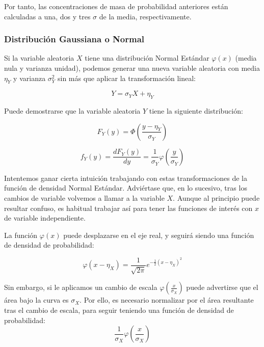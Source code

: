 \documentclass[11pt]{article}
\begin{document}
Por tanto, las concentraciones de masa de probabilidad anteriores están
calculadas a una, dos y tres \(\sigma\) de la media, respectivamente.

    \hypertarget{distribuciuxf3n-gaussiana-o-normal}{%
\subsubsection*{Distribución Gaussiana o
Normal}\label{distribuciuxf3n-gaussiana-o-normal}}

Si la variable aleatoria \(X\) tiene una distribución Normal Estándar
\(\varphi(x)\) (media nula y varianza unidad), podemos generar una nueva
variable aleatoria con media \(\eta_Y\) y varianza \(\sigma_Y^2\) sin
más que aplicar la transformación lineal:

\[Y = \sigma_Y X + \eta_Y\]

Puede demostrarse que la variable aleatoria \(Y\) tiene la siguiente
distribución:

\[F_Y(y)= \Phi(\frac{y-\eta_Y}{\sigma_Y})\]

\[f_Y(y) =\frac{dF_Y(y)}{dy} = \frac{1}{\sigma_Y}\varphi(\frac{y}{\sigma_Y})\]

    Intentemos ganar cierta intuición trabajando con estas transformaciones
de la función de densidad Normal Estándar. Adviértase que, en lo
sucesivo, tras los cambios de variable volvemos a llamar a la variable
\(X\). Aunque al principio puede resultar confuso, es habitual trabajar
así para tener las funciones de interés con \(x\) de variable
independiente.

La función \(\varphi(x)\) puede desplazarse en el eje real, y seguirá
siendo una función de densidad de probabilidad:

\[\varphi(x-\eta_X)=\frac{1}{\sqrt{2\pi}}e^{-\frac{1}{2}(x-\eta_X)^2}\]

Sin embargo, si le aplicamos un cambio de escala
\(\varphi(\frac{x}{\sigma_X})\) puede advertirse que el área bajo la
curva es \(\sigma_X\). Por ello, es necesario normalizar por el área
resultante tras el cambio de escala, para seguir teniendo una función de
densidad de probabilidad:
\[\frac{1}{\sigma_X}\varphi(\frac{x}{\sigma_X})\]

    \begin{center}
    \end{center}
    { \hspace*{\fill} \\}
    
\end{document}
